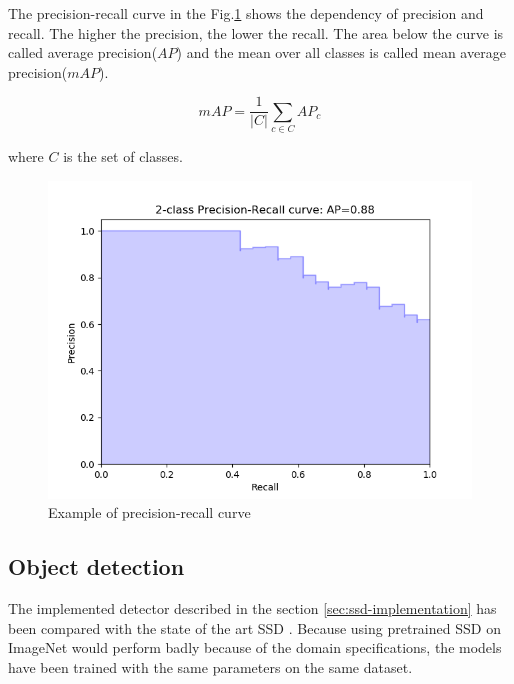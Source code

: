 \documentclass[a4paper,12pt,titlepage]{article}
\numberwithin{figure}{section}
\begin{document}
The precision-recall curve in the Fig.\ref{fig:precision-recall} shows the dependency of precision and recall. The higher the precision, the lower the recall. The area below the curve is called average precision($AP$) and the mean over all classes is called mean average precision($mAP$).

\begin{equation}
mAP = \frac{1}{|C|} \sum_{c \in C} AP_c
\end{equation}

where $C$ is the set of classes.

\begin{figure}[H]
\centering
\includegraphics[width=1\linewidth]{fig/precision-recall.png}
\caption{Example of precision-recall curve}
\label{fig:precision-recall}
\end{figure}

\subsection{Object detection}
The implemented detector described in the section \ref{sec:ssd-implementation} has been compared with the state of the art SSD \cite{liu2016ssd}. Because using pretrained SSD on ImageNet would perform badly because of the domain specifications, the models have been trained with the same parameters on the same dataset. 
\end{document}
